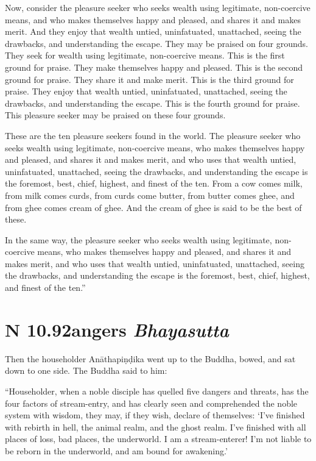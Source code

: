 \documentclass[12pt,openany]{book}%
\newcommand*{\suttatitleacronym}[1]{\smaller[2]{#1}\vspace*{.3em}}
\newcommand*{\suttatitletranslation}[1]{\linebreak{#1}}
\newcommand*{\suttatitleroot}[1]{\linebreak\smaller[2]\itshape{#1}}
\newcommand*{\tocacronym}[1]{\hspace*{-3.3em}{#1}\quad}
\newcommand*{\toctranslation}[1]{#1}
\newcommand*{\tocroot}[1]{(\textit{#1})}
\begin{document}
Now, consider the pleasure seeker who seeks wealth using legitimate, non-coercive means, and who makes themselves happy and pleased, and shares it and makes merit. And they enjoy that wealth untied, uninfatuated, unattached, seeing the drawbacks, and understanding the escape. They may be praised on four grounds. They seek for wealth using legitimate, non-coercive means. This is the first ground for praise. They make themselves happy and pleased. This is the second ground for praise. They share it and make merit. This is the third ground for praise. They enjoy that wealth untied, uninfatuated, unattached, seeing the drawbacks, and understanding the escape. This is the fourth ground for praise. This pleasure seeker may be praised on these four grounds. 

These are the ten pleasure seekers found in the world. The pleasure seeker who seeks wealth using legitimate, non-coercive means, who makes themselves happy and pleased, and shares it and makes merit, and who uses that wealth untied, uninfatuated, unattached, seeing the drawbacks, and understanding the escape is the foremost, best, chief, highest, and finest of the ten. From a cow comes milk, from milk comes curds, from curds come butter, from butter comes ghee, and from ghee comes cream of ghee. And the cream of ghee is said to be the best of these. 

In the same way, the pleasure seeker who seeks wealth using legitimate, non-coercive means, who makes themselves happy and pleased, and shares it and makes merit, and who uses that wealth untied, uninfatuated, unattached, seeing the drawbacks, and understanding the escape is the foremost, best, chief, highest, and finest of the ten.” 

%
\section*{{\suttatitleacronym AN 10.92}{\suttatitletranslation Dangers }{\suttatitleroot Bhayasutta}}
\addcontentsline{toc}{section}{\tocacronym{AN 10.92} \toctranslation{Dangers } \tocroot{Bhayasutta}}

Then the householder \textsanskrit{Anāthapiṇḍika} went up to the Buddha, bowed, and sat down to one side. The Buddha said to him: 

“Householder, when a noble disciple has quelled five dangers and threats, has the four factors of stream-entry, and has clearly seen and comprehended the noble system with wisdom, they may, if they wish, declare of themselves: ‘I’ve finished with rebirth in hell, the animal realm, and the ghost realm. I’ve finished with all places of loss, bad places, the underworld. I am a stream-enterer! I’m not liable to be reborn in the underworld, and am bound for awakening.’ 
\end{document}
